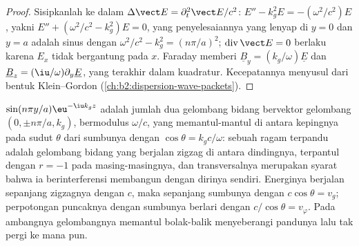 \begin{proof}
Sisipkanlah ke dalam $\Delta\vect E = \partial_t^2\vect E/c^2$: $E'' - k_g^2E = -(\omega^2/c^2)E$, yakni
$E'' + (\omega^2/c^2 - k_g^2)E = 0$, yang penyelesaiannya yang lenyap di $y = 0$ dan
$y = a$ adalah sinus dengan $\omega^2/c^2 - k_g^2 = (n\pi/a)^2$; $\operatorname{div}
\vect E = 0$ berlaku karena $E_x$ tidak bergantung pada $x$. Faraday memberi
$\underline B_y = (k_g/\omega)\underline E$ dan $\underline B_z = (\iu/\omega)\partial_y\underline E$, yang terakhir
dalam kuadratur. Kecepatannya menyusul dari bentuk Klein--Gordon
 (\cref{ch:b2:dispersion-wave-packets}).
\end{proof}

\begin{remark}\label{rem:b2:guided-waves:zigzag}
$\sin(n\pi y/a)\eu^{-\iu k_gz}$ adalah jumlah dua gelombang bidang bervektor
gelombang $(0, \pm n\pi/a, k_g)$, bermodulus $\omega/c$, yang memantul-mantul di antara
kepingnya pada sudut $\theta$ dari sumbunya dengan $\cos\theta = k_gc/\omega$:
sebuah ragam terpandu adalah gelombang bidang yang berjalan zigzag di antara dindingnya, terpantul
dengan $r = -1$ pada masing-masingnya, dan  transversalnya merupakan
syarat bahwa ia berinterferensi membangun dengan dirinya sendiri. Energinya
berjalan sepanjang zigzagnya dengan $c$, maka sepanjang sumbunya dengan $c\cos\theta = v_g$;
perpotongan puncaknya dengan sumbunya berlari dengan $c/\cos\theta = v_\varphi$. Pada
ambangnya gelombangnya memantul bolak-balik menyeberangi pandunya lalu tak pergi
ke mana pun.
\end{remark}

